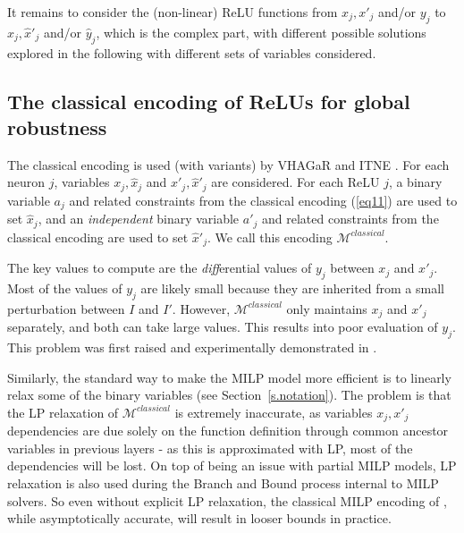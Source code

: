 It remains to consider the (non-linear) ReLU functions from $x_j,x'_j$ and/or $y_j$ to $\hat{x}_j,\hat{x}'_j$ and/or $\hat{y}_j$, which is the complex part, with different possible solutions explored in the following with different sets of variables considered. 





	
\subsection{The classical encoding of ReLUs for global robustness}
	
    The classical encoding is used (with variants) by VHAGaR \cite{vhagar} and ITNE \cite{ITNE}. For each neuron $j$, variables $x_j,\hat{x}_j$ and $x'_j,\hat{x}'_j$ are considered. For each ReLU $j$, a binary variable $a_j$ and related constraints from the classical encoding (\ref{eq11}) \cite{MILP} are used to set $\hat{x}_j$, and an {\em independent} binary variable $a'_j$ and related constraints from the classical encoding are used to set $\hat{x}'_j$. We call this encoding $\mathcal{M}^{classical}$.
	
	The key values to compute are the {\em diff}erential values of $y_j$ between $x_j$ and $x'_j$. Most of the values of $y_j$ are likely small because they are inherited from a small perturbation between $I$ and $I'$.
	However, $\mathcal{M}^{classical}$ only maintains $x_j$ and $x'_j$ separately, and both can take large values. This results into poor evaluation of $y_j$. This problem was first raised and experimentally demonstrated in \cite{diff}.

	Similarly, the standard way to make the MILP model more efficient is to linearly relax some of the binary variables (see Section~\ref{s.notation}). The problem is that the LP relaxation of $\mathcal{M}^{classical}$ is extremely inaccurate, as variables $x_j,x'_j$ dependencies are due solely on the function definition through common ancestor variables in previous layers - as this is approximated with LP, most of the dependencies will be lost. On top of being an issue with partial MILP models, LP relaxation is also used during the Branch and Bound process internal to MILP solvers. 
	So even without explicit LP relaxation, the classical MILP encoding of \cite{MILP}, while asymptotically accurate, will result in looser bounds in practice. 
	
